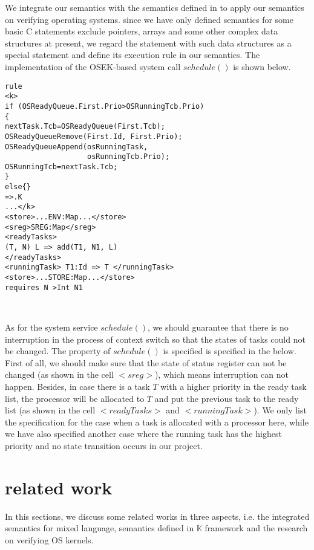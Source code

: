 \documentclass[letterpaper, 10 pt, conference]{IEEEtran}
\begin{document}
\par We integrate our semantics with the semantics defined in \cite{xiaoran} to apply our semantics on verifying operating systems. since we have only defined semantics for some basic C statements exclude pointers, arrays and some other complex data structures at present, we regard the statement with such data structures as a special statement and define its execution rule in our semantics. The implementation of the OSEK-based system call $schedule()$ is shown below.
\vspace{11pt}
\lstset{style=k}
\begin{minipage}{0.7\textwidth}
\begin{BVerbatim}
rule
<k>
if (OSReadyQueue.First.Prio>OSRunningTcb.Prio)
{
nextTask.Tcb=OSReadyQueue(First.Tcb);
OSReadyQueueRemove(First.Id, First.Prio);
OSReadyQueueAppend(osRunningTask,
                   osRunningTcb.Prio);
OSRunningTcb=nextTask.Tcb;
}
else{}
=>.K
...</k>
<store>...ENV:Map...</store>
<sreg>SREG:Map</sreg>
<readyTasks>
(T, N) L => add(T1, N1, L)
</readyTasks>
<runningTask> T1:Id => T </runningTask>
<store>...STORE:Map...</store>
requires N >Int N1
\end{BVerbatim}
\end{minipage}\\
\vspace{11pt}
\par As for the system service $schedule()$, we should guarantee that there is no interruption in the process of context switch so that the states of tasks could not be changed. The property of $schedule()$ is specified is specified in the below. First of all, we should make sure that the state of status register can not be changed (as shown in the cell $<sreg>$), which means interruption can not happen. Besides, in case there is a task $T$ with a higher priority in the ready task list, the processor will be allocated to $T$ and put the previous task to the ready list (as shown in the cell $<readyTasks>$ and $<runningTask>$). We only list the specification for the case when a task is allocated with a processor here, while we have also specified another case where the running task has the highest priority and no state transition occurs in our project.

\section{related work}
\par In this sections, we discuss some related works in three aspects, i.e. the integrated semantics for mixed language, semantics defined in $\mathbb{K}$ framework and the research on verifying OS kernels.
\end{document}
